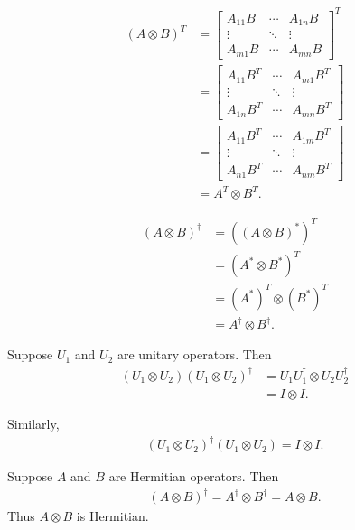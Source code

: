 \begin{align*}
	(A\otimes B)^T &=
	\begin{bmatrix}
		A_{11} B & \cdots & A_{1n} B \\
		\vdots & \ddots  & \vdots \\
		A_{m1}B & \cdots & A_{mn} B
	\end{bmatrix}^T \\
	&=
	\begin{bmatrix}
		A_{11} B^T & \cdots & A_{m1} B^T \\
		\vdots & \ddots  & \vdots \\
		A_{1n} B^T & \cdots & A_{mn} B^T
	\end{bmatrix} \\
	&=
	\begin{bmatrix}
		A_{11} B^T & \cdots & A_{1m} B^T \\
		\vdots & \ddots  & \vdots \\
		A_{n1} B^T & \cdots & A_{nm} B^T
	\end{bmatrix} \\
	&= A^T \otimes B^T.
\end{align*}


\begin{align*}
	(A\otimes B)^\dagger&=((A \otimes B)^*)^T	\\
		&= (A^* \otimes B^*)^T\\
		&= (A^*)^T \otimes (B^*)^T\\
		&= A^\dagger \otimes B^\dagger.
\end{align*}

Suppose $U_1$ and $U_2$ are unitary operators. Then
\begin{align*}
	(U_1 \otimes U_2) (U_1 \otimes U_2)^\dagger &=U_1 U_1^\dagger \otimes U_2 U_2^\dagger\\
		&= I \otimes I.
\end{align*}

Similarly,
\begin{align*}
	(U_1 \otimes U_2)^\dagger (U_1 \otimes U_2)  = I \otimes I.
\end{align*}

Suppose $A$ and $B$ are Hermitian operators. Then
\begin{align}
(A \otimes B)^\dagger = A^\dagger \otimes B^\dagger = A \otimes B.
\end{align}
Thus $A \otimes B$ is Hermitian.




